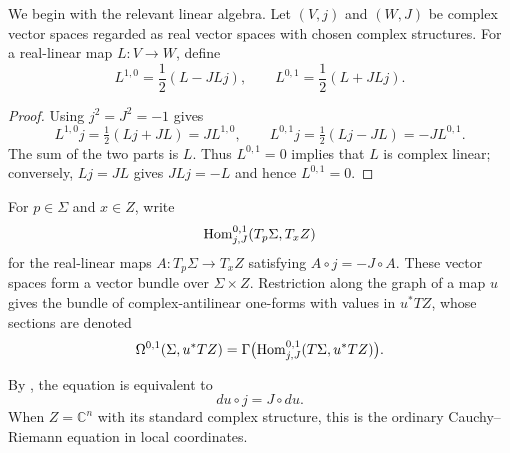 We begin with the relevant linear algebra. Let $(V,j)$ and $(W,J)$ be complex
vector spaces regarded as real vector spaces with chosen complex structures.
For a real-linear map $L\colon V\to W$, define
\begin{equation}
  \label{eq:Linear_Antilinear_Decomposition_Fourteen}
  L^{1,0}=\frac12(L-JLj),
  \qquad
  L^{0,1}=\frac12(L+JLj).
\end{equation}


\begin{proof}
  Using $j^2=J^2=-1$ gives
  \[
    L^{1,0}j=\tfrac12(Lj+JL)=JL^{1,0},\qquad
    L^{0,1}j=\tfrac12(Lj-JL)=-JL^{0,1}.
  \]
  The sum of the two parts is $L$. Thus $L^{0,1}=0$ implies that
  $L$ is complex linear; conversely, $Lj=JL$ gives $JLj=-L$ and
  hence $L^{0,1}=0$.
\end{proof}

For $p\in\Sigma$ and $x\in Z$, write
\[
  \operatorname{Hom}^{0,1}_{j,J}(T_p\Sigma,T_xZ)
\]
for the real-linear maps $A\colon T_p\Sigma\to T_xZ$ satisfying
$A\circ j=-J\circ A$. These vector spaces form a vector bundle over
$\Sigma\times Z$. Restriction along the graph of a map $u$ gives the bundle
of complex-antilinear one-forms with values in $u^*TZ$, whose sections are
denoted
\[
  \Omega^{0,1}(\Sigma,u^*TZ)
  =
  \Gamma\bigl(
    \operatorname{Hom}^{0,1}_{j,J}(T\Sigma,u^*TZ)
  \bigr).
\]


By , the equation is
equivalent to
\[
  du\circ j=J\circ du.
\]
When $Z=\mathbb C^n$ with its standard complex structure, this is the ordinary
Cauchy--Riemann equation in local coordinates.

